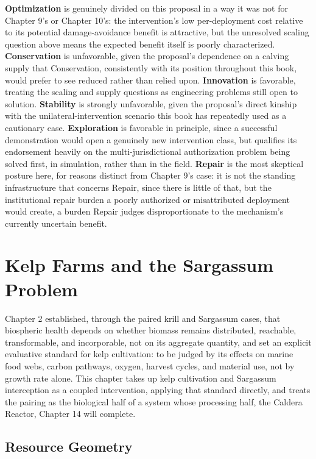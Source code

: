 \documentclass[11pt,oneside]{book}
\begin{document}
\textbf{Optimization} is genuinely divided on this proposal in a way it was not for Chapter 9's or Chapter 10's: the intervention's low per-deployment cost relative to its potential damage-avoidance benefit is attractive, but the unresolved scaling question above means the expected benefit itself is poorly characterized. \textbf{Conservation} is unfavorable, given the proposal's dependence on a calving supply that Conservation, consistently with its position throughout this book, would prefer to see reduced rather than relied upon. \textbf{Innovation} is favorable, treating the scaling and supply questions as engineering problems still open to solution. \textbf{Stability} is strongly unfavorable, given the proposal's direct kinship with the unilateral-intervention scenario this book has repeatedly used as a cautionary case. \textbf{Exploration} is favorable in principle, since a successful demonstration would open a genuinely new intervention class, but qualifies its endorsement heavily on the multi-jurisdictional authorization problem being solved first, in simulation, rather than in the field. \textbf{Repair} is the most skeptical posture here, for reasons distinct from Chapter 9's case: it is not the standing infrastructure that concerns Repair, since there is little of that, but the institutional repair burden a poorly authorized or misattributed deployment would create, a burden Repair judges disproportionate to the mechanism's currently uncertain benefit.

\chapter{Kelp Farms and the Sargassum Problem}

Chapter 2 established, through the paired krill and Sargassum cases, that biospheric health depends on whether biomass remains distributed, reachable, transformable, and incorporable, not on its aggregate quantity, and set an explicit evaluative standard for kelp cultivation: to be judged by its effects on marine food webs, carbon pathways, oxygen, harvest cycles, and material use, not by growth rate alone. This chapter takes up kelp cultivation and Sargassum interception as a coupled intervention, applying that standard directly, and treats the pairing as the biological half of a system whose processing half, the Caldera Reactor, Chapter 14 will complete.

\section*{Resource Geometry}
\end{document}
